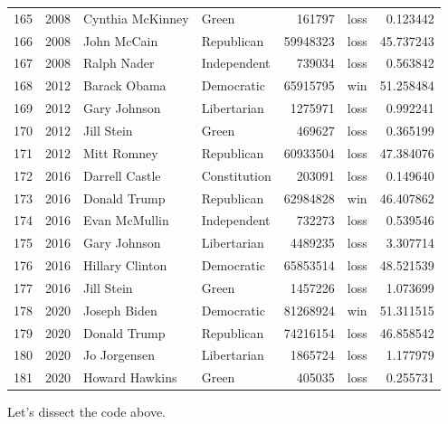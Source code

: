 \documentclass[
  letterpaper,
  DIV=11,
  numbers=noendperiod]{scrreprt}
\begin{document}
\begin{tabular}{lrllrlr}
165 &  2008 &        Cynthia McKinney &                  Green &        161797 &   loss &   0.123442 \\
166 &  2008 &             John McCain &             Republican &      59948323 &   loss &  45.737243 \\
167 &  2008 &             Ralph Nader &            Independent &        739034 &   loss &   0.563842 \\
168 &  2012 &            Barack Obama &             Democratic &      65915795 &    win &  51.258484 \\
169 &  2012 &            Gary Johnson &            Libertarian &       1275971 &   loss &   0.992241 \\
170 &  2012 &              Jill Stein &                  Green &        469627 &   loss &   0.365199 \\
171 &  2012 &             Mitt Romney &             Republican &      60933504 &   loss &  47.384076 \\
172 &  2016 &          Darrell Castle &           Constitution &        203091 &   loss &   0.149640 \\
173 &  2016 &            Donald Trump &             Republican &      62984828 &    win &  46.407862 \\
174 &  2016 &           Evan McMullin &            Independent &        732273 &   loss &   0.539546 \\
175 &  2016 &            Gary Johnson &            Libertarian &       4489235 &   loss &   3.307714 \\
176 &  2016 &         Hillary Clinton &             Democratic &      65853514 &   loss &  48.521539 \\
177 &  2016 &              Jill Stein &                  Green &       1457226 &   loss &   1.073699 \\
178 &  2020 &            Joseph Biden &             Democratic &      81268924 &    win &  51.311515 \\
179 &  2020 &            Donald Trump &             Republican &      74216154 &   loss &  46.858542 \\
180 &  2020 &            Jo Jorgensen &            Libertarian &       1865724 &   loss &   1.177979 \\
181 &  2020 &          Howard Hawkins &                  Green &        405035 &   loss &   0.255731 \\
\bottomrule
\end{tabular}

Let's dissect the code above.
\end{document}
